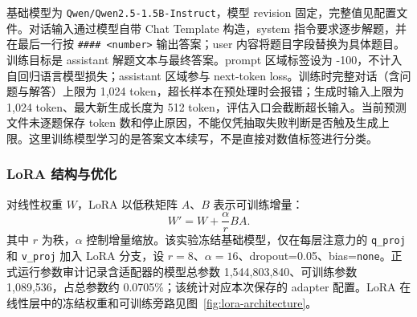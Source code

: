 \documentclass[UTF8,a4paper,12pt,fontset=none]{ctexart}
\begin{document}
基础模型为 \texttt{Qwen/Qwen2.5-1.5B-Instruct}，模型 revision 固定，完整值见配置文件。对话输入通过模型自带 Chat Template 构造，system 指令要求逐步解题，并在最后一行按 \texttt{\#\#\#\# <number>} 输出答案；user 内容将题目字段替换为具体题目。训练目标是 assistant 解题文本与最终答案。prompt 区域标签设为 -100，不计入自回归语言模型损失；assistant 区域参与 next-token loss。训练时完整对话（含问题与解答）上限为 1,024 token，超长样本在预处理时会报错；生成时输入上限为 1,024 token、最大新生成长度为 512 token，评估入口会截断超长输入。当前预测文件未逐题保存 token 数和停止原因，不能仅凭抽取失败判断是否触及生成上限。这里训练模型学习的是答案文本续写，不是直接对数值标签进行分类\cite{qwen,gsm8k}。

\subsubsection{LoRA 结构与优化}
对线性权重 $W$，LoRA 以低秩矩阵 $A$、$B$ 表示可训练增量：
\[
  W'=W+\frac{\alpha}{r}BA.
\]
其中 $r$ 为秩，$\alpha$ 控制增量缩放。该实验冻结基础模型，仅在每层注意力的 \texttt{q\_proj} 和 \texttt{v\_proj} 加入 LoRA 分支，设 $r=8$、$\alpha=16$、dropout=0.05、bias=\texttt{none}。正式运行参数审计记录含适配器的模型总参数 1,544,803,840、可训练参数 1,089,536，占总参数约 0.0705\%；该统计对应本次保存的 adapter 配置\cite{lora}。LoRA 在线性层中的冻结权重和可训练旁路见图~\ref{fig:lora-architecture}。
\end{document}
